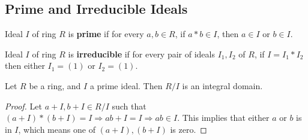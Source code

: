 \subsection{Prime and Irreducible Ideals}
\begin{definition} \label{def:idealprime}
  Ideal $I$ of ring $R$ is \textbf{prime} if for every $a, b \in R$, if $a * b \in I$, then $a \in I$ or $b \in I$.
\end{definition}
\begin{definition} \label{def:idealirred}
  Ideal $I$ of ring $R$ is \textbf{irreducible} if for every pair of ideals $I_{1}, I_{2}$ of $R$, if $I = I_{1} * I_{2}$ then either $I_{1} = (1)$ or $I_{2} = (1)$.
\end{definition}
\begin{lemma} \label{lem:primeintegral}
  Let $R$ be a ring, and $I$ a prime ideal.
  Then $R \big/ I$ is an integral domain.
\end{lemma}
\begin{proof} \label{proof:primeintegral}
  Let $a + I, b + I \in R \big/ I$ such that $(a + I) * (b + I) = I \Rightarrow ab + I = I \Rightarrow ab \in I$.
  This implies that either $a$ or $b$ is in $I$, which means one of $(a + I), (b + I)$ is zero.
\end{proof}
